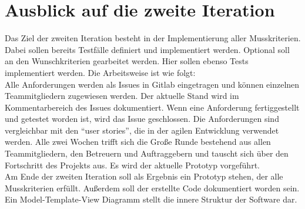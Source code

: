 \section{Ausblick auf die zweite Iteration}
Das Ziel der zweiten Iteration besteht in der Implementierung aller Musskriterien. Dabei sollen bereits Testfälle definiert und implementiert werden. Optional soll an den Wunschkriterien gearbeitet werden. Hier sollen ebenso Tests implementiert werden. Die Arbeitsweise ist wie folgt: \\

\noindent Alle Anforderungen werden als Issues in Gitlab eingetragen und können einzelnen Teammitgliedern zugewiesen werden. Der aktuelle Stand wird im Kommentarbereich des Issues dokumentiert. Wenn eine Anforderung fertiggestellt und getestet worden ist, wird das Issue geschlossen. Die Anforderungen sind vergleichbar mit den "`user stories"', die in der agilen Entwicklung verwendet werden. Alle zwei Wochen trifft sich die Große Runde bestehend aus allen Teammitgliedern, den Betreuern und Auftraggebern und tauscht sich über den Fortschritt des Projekts aus. Es wird der aktuelle Prototyp vorgeführt. \\

\noindent Am Ende der zweiten Iteration soll als Ergebnis ein Prototyp stehen, der alle Musskriterien erfüllt. Außerdem soll der erstellte Code dokumentiert worden sein. Ein Model-Template-View Diagramm stellt die innere Struktur der Software dar. 